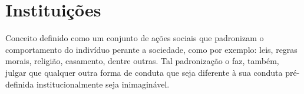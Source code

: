 \documentclass[
	12pt,				%
	openany,
	oneside,			%
	a4paper,			%
	chapter=TITLE,		%
	english,			%
	brazil				%
]{abntex2}
\begin{document}
\chapter{Instituições}
Conceito definido como um conjunto de ações sociais que padronizam o comportamento do indivíduo perante a sociedade, como por exemplo: leis, regras morais, religião, casamento, dentre outras. Tal padronização o faz, também, julgar que qualquer outra forma de conduta que seja diferente à sua conduta pré-definida institucionalmente seja inimaginável.

\postextual


\end{document}

